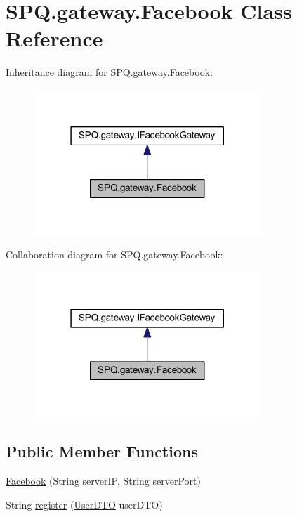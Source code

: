 \hypertarget{class_s_p_q_1_1gateway_1_1_facebook}{}\section{S\+P\+Q.\+gateway.\+Facebook Class Reference}
\label{class_s_p_q_1_1gateway_1_1_facebook}


Inheritance diagram for S\+P\+Q.\+gateway.\+Facebook\+:
\nopagebreak
\begin{figure}[H]
\begin{center}
\leavevmode
\includegraphics[width=243pt]{class_s_p_q_1_1gateway_1_1_facebook__inherit__graph}
\end{center}
\end{figure}


Collaboration diagram for S\+P\+Q.\+gateway.\+Facebook\+:
\nopagebreak
\begin{figure}[H]
\begin{center}
\leavevmode
\includegraphics[width=243pt]{class_s_p_q_1_1gateway_1_1_facebook__coll__graph}
\end{center}
\end{figure}
\subsection*{Public Member Functions}
\begin{DoxyCompactItemize}
\item 
\mbox{\hyperlink{class_s_p_q_1_1gateway_1_1_facebook_a428ab89808ef8f9d2d0ac5e60c9135e3}{Facebook}} (String server\+IP, String server\+Port)
\item 
String \mbox{\hyperlink{class_s_p_q_1_1gateway_1_1_facebook_aba03bc89c530d3f2159b3a1eb65c3427}{register}} (\mbox{\hyperlink{class_s_p_q_1_1dto_1_1_user_d_t_o}{User\+D\+TO}} user\+D\+TO)
\end{DoxyCompactItemize}


